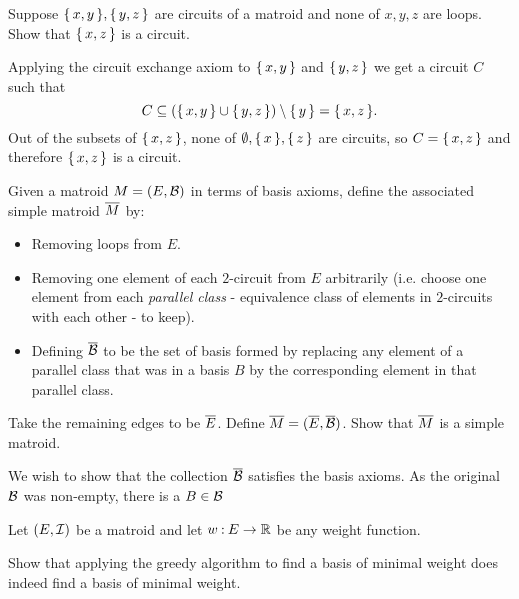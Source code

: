 \documentclass[12pt]{memoir}
\begin{document}
\begin{Ej}[Exercise 5]
   Suppose $\{\,x,y\,\},\{\,y,z\,\}$ are circuits of a matroid and none of $x,y,z$ are loops. Show that $\{\,x,z\,\}$ is a circuit.
\end{Ej}

\begin{ptcbr}
    Applying the circuit exchange axiom to $\{\,x,y\,\}$ and $\{\,y,z\,\}$ we get a circuit $C$ such that 
    $$C\subseteq(\{\,x,y\,\}\cup\{\,y,z\,\})\setminus\{\,y\,\}=\{\,x,z\,\}.$$
    Out of the subsets of $\{\,x,z\,\}$, none of $\emptyset,\{\,x\,\},\{\,z\,\}$ are circuits, so $C=\{\,x,z\,\}$ and therefore $\{\,x,z\,\}$ is a circuit.
\end{ptcbr}

\begin{Ej}[Exercise 6]
    Given a matroid $M=(E,\mathcal{B})$ in terms of basis axioms, define the associated simple matroid $\overline M$ by:
    \begin{itemize}
        \itemsep=-0.4em
        \item Removing loops from $E$.
        \item Removing one element of each $2$-circuit from $E$ arbitrarily (i.e. choose one element from each
        \emph{parallel class} - equivalence class of elements in $2$-circuits with each other - to keep).
        \item Defining $\overline {\mathcal{B}}$ to be the set of basis formed by replacing any element of a parallel class that was in a basis $B$ by the corresponding element in that parallel class.
    \end{itemize}
    Take the remaining edges to be $\overline E$. Define $\overline M=(\overline E,\overline {\mathcal{B}})$. Show that $\overline M$ is a simple matroid. 
\end{Ej}

\begin{ptcbr}
    We wish to show that the collection $\overline{\mathcal{B}}$ satisfies the basis axioms. As the original $\mathcal{B}$ was non-empty, there is a $B\in\mathcal{B}$  
\end{ptcbr}

\begin{Ej}[Exercise 7]
    Let $(E, \mathcal{I})$ be a matroid and let $w\mathbin{:} E\to\mathbb{R}$ be any weight function.\par
    Show that applying the greedy algorithm to find a basis of minimal weight does indeed find a basis of minimal weight.
\end{Ej}
\end{document}
